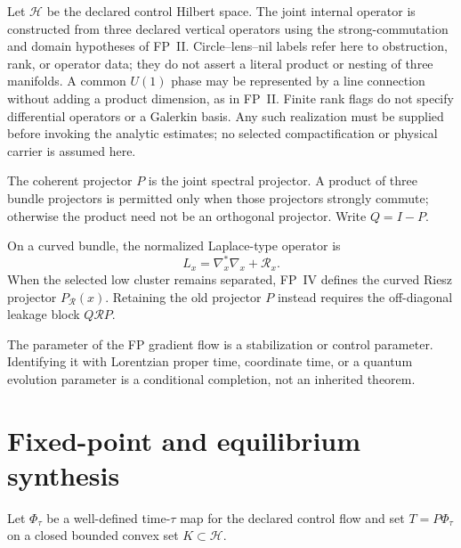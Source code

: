 \documentclass[11pt]{article}
\begin{document}
Let $\mathcal H$ be the declared control Hilbert space. The joint internal
operator is constructed from three declared vertical operators using the
strong-commutation and domain hypotheses of FP~II. Circle--lens--nil labels
refer here to obstruction, rank, or operator data; they do not assert a literal
product or nesting of three manifolds. A common $U(1)$ phase may be represented
by a line connection without adding a product dimension, as in FP~II.
Finite rank flags do not specify differential operators or a Galerkin basis.
Any such realization must be supplied before invoking the analytic estimates;
no selected compactification or physical carrier is assumed here.

The coherent projector $P$ is the joint spectral projector. A product of three
bundle projectors is permitted only when those projectors strongly commute;
otherwise the product need not be an orthogonal projector. Write $Q=I-P$.

On a curved bundle, the normalized Laplace-type operator is
\[
 L_x=\nabla_x^\ast\nabla_x+\mathcal R_x.
\]
When the selected low cluster remains separated, FP~IV defines the curved
Riesz projector $P_{\mathcal R}(x)$. Retaining the old projector $P$ instead
requires the off-diagonal leakage block $Q\mathcal RP$.

The parameter of the FP gradient flow is a stabilization or control
parameter. Identifying it with Lorentzian proper time, coordinate time, or a
quantum evolution parameter is a conditional completion, not an inherited
theorem.

\section{Fixed-point and equilibrium synthesis}

Let $\Phi_\tau$ be a well-defined time-$\tau$ map for the declared control
flow and set $T=P\Phi_\tau$ on a closed bounded convex set $K\subset\mathcal H$.
\end{document}

